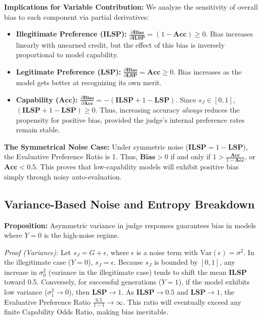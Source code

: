 \documentclass{article}
\theoremstyle{plain}
\theoremstyle{definition}
\theoremstyle{remark}
\begin{document}
\textbf{Implications for Variable Contribution:}
We analyze the sensitivity of overall bias to each component via partial derivatives:
\begin{itemize}
    \item \textbf{Illegitimate Preference ($\textbf{ILSP}$):} $\frac{\partial \textbf{Bias}}{\partial \textbf{ILSP}} = (1 - \textbf{Acc}) \ge 0$. Bias increases linearly with unearned credit, but the effect of this bias is inversely proportional to model capability.
    \item \textbf{Legitimate Preference ($\textbf{LSP}$):} $\frac{\partial \textbf{Bias}}{\partial \textbf{LSP}} = \textbf{Acc} \ge 0$. Bias increases as the model gets better at recognizing its own merit.
    \item \textbf{Capability ($\textbf{Acc}$):} $\frac{\partial \textbf{Bias}}{\partial \textbf{Acc}} = -(\textbf{ILSP} + 1 - \textbf{LSP})$. Since $s_J \in [0, 1]$, $(\textbf{ILSP} + 1 - \textbf{LSP}) \ge 0$. Thus, increasing accuracy \textit{always} reduces the propensity for positive bias, provided the judge's internal preference rates remain stable.
\end{itemize}

\textbf{The Symmetrical Noise Case:} Under symmetric noise ($\textbf{ILSP} = 1 - \textbf{LSP}$), the Evaluative Preference Ratio is 1. Thus, $\textbf{Bias} > 0$ if and only if $1 > \frac{\textbf{Acc}}{1 - \textbf{Acc}}$, or $\textbf{Acc} < 0.5$. This proves that low-capability models will exhibit positive bias simply through noisy auto-evaluation.

\subsection{Variance-Based Noise and Entropy Breakdown}
\label{proof:variance}
\textbf{Proposition:} Asymmetric variance in judge responses guarantees bias in models where $Y=0$ is the high-noise regime.

\textit{Proof (Variance):} Let $s_J = G + \epsilon$, where $\epsilon$ is a noise term with $\text{Var}(\epsilon) = \sigma^2$. In the illegitimate case ($Y=0$), $s_J = \epsilon$. Because $s_J$ is bounded by $[0, 1]$, any increase in $\sigma^2_0$ (variance in the illegitimate case) tends to shift the mean $\textbf{ILSP}$ toward 0.5. Conversely, for successful generations ($Y=1$), if the model exhibits low variance ($\sigma^2_1 \to 0$), then $\textbf{LSP} \to 1$.
As $\textbf{ILSP} \to 0.5$ and $\textbf{LSP} \to 1$, the Evaluative Preference Ratio $\frac{0.5}{1 - 1} \to \infty$. This ratio will eventually exceed any finite Capability Odds Ratio, making bias inevitable.
\end{document}
